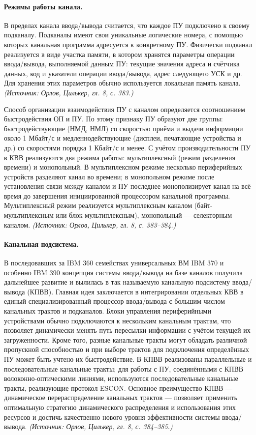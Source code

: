 \documentclass[a4paper,12pt]{article}
\begin{document}
\paragraph{Режимы работы канала.}
В пределах канала ввода/вывода считается, что каждое ПУ подключено к своему подканалу. Подканалы имеют свои уникальные логические номера, с помощью которых канальная программа адресуется к конкретному ПУ. Физически подканал реализуется в виде участка памяти, в котором хранятся параметры операции ввода/вывода, выполняемой данным ПУ: текущие значения адреса и счётчика данных, код и указатели операции ввода/вывода, адрес следующего УСК и др. Для хранения этих параметров обычно используется локальная память канала.
\textit{(Источник: Орлов, Цилькер, гл. 8, с. 383.)}

Способ организации взаимодействия ПУ с каналом определяется соотношением быстродействия ОП и ПУ. По этому признаку ПУ образуют две группы: быстродействующие (НМД, НМЛ) со скоростью приёма и выдачи информации около 1 Мбайт/с и медленнодействующие (дисплеи, печатающие устройства и др.) со скоростями порядка 1 Кбайт/с и менее. С учётом производительности ПУ в КВВ реализуются два режима работы: мультиплексный (режим разделения времени) и монопольный. В мультиплексном режиме несколько периферийных устройств разделяют канал во времени; в монопольном режиме после установления связи между каналом и ПУ последнее монополизирует канал на всё время до завершения инициированной процессором канальной программы. Мультиплексный режим реализуется мультиплексным каналом (байт-мультиплексным или блок-мультиплексным), монопольный — селекторным каналом.
\textit{(Источник: Орлов, Цилькер, гл. 8, с. 383--384.)}

\paragraph{Канальная подсистема.}
В последовавших за IBM 360 семействах универсальных ВМ IBM 370 и особенно IBM 390 концепция системы ввода/вывода на базе каналов получила дальнейшее развитие и вылилась в так называемую канальную подсистему ввода/вывода (КПВВ). Главная идея заключается в интегрировании отдельных КВВ в единый специализированный процессор ввода/вывода с большим числом канальных трактов и подканалов. Блоки управления периферийными устройствами обычно подключаются к нескольким канальным трактам, что позволяет динамически менять путь пересылки информации с учётом текущей их загруженности. Кроме того, разные канальные тракты могут обладать различной пропускной способностью и при выборе трактов для подключения определённых ПУ может быть учтено их быстродействие. В КПВВ реализованы параллельные и последовательные канальные тракты; для работы с ПУ, соединёнными с КПВВ волоконно-оптическими линиями, используются последовательные канальные тракты, реализующие протокол ESCON. Основное преимущество КПВВ — динамическое перераспределение канальных трактов — позволяет применить оптимальную стратегию динамического распределения и использования этих ресурсов и достичь качественно нового уровня эффективности системы ввода/вывода.
\textit{(Источник: Орлов, Цилькер, гл. 8, с. 384--385.)}
\end{document}
